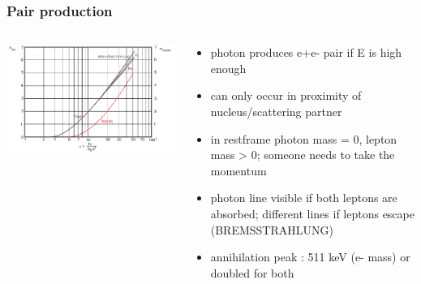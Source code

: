 \documentclass[aspectratio=1610, 9pt]{beamer}
\begin{document}
\begin{frame}\frametitle{Pair production}
  \begin{columns}
    \begin{column}[c]{0.48\textwidth}
      \includegraphics[width=\textwidth]{plots/pair_triplett.png}
    \end{column}
    \begin{column}[c]{0.48\textwidth}
      \begin{itemize}
        \item photon produces e+e- pair if E is high enough
        \item can only occur in proximity of nucleus/scattering partner
        \item in restframe photon mass = 0, lepton mass > 0; someone needs to take the momentum
        \item photon line visible if both leptons are absorbed; different lines if leptons escape (BREMSSTRAHLUNG)
        \item annihilation peak : 511 keV (e- mass) or doubled for both
      \end{itemize}
    \end{column}
  \end{columns}
\end{frame}
\end{document}
